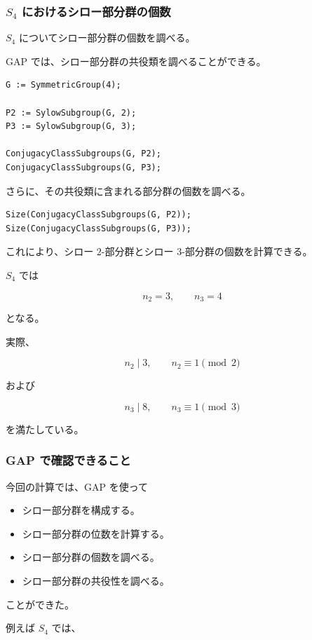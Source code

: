\subsubsection{$S_4$ におけるシロー部分群の個数}

$S_4$ についてシロー部分群の個数を調べる。

GAP では、シロー部分群の共役類を調べることができる。

\begin{lstlisting}[language={}]
G := SymmetricGroup(4);

P2 := SylowSubgroup(G, 2);
P3 := SylowSubgroup(G, 3);

ConjugacyClassSubgroups(G, P2);
ConjugacyClassSubgroups(G, P3);
\end{lstlisting}

さらに、その共役類に含まれる部分群の個数を調べる。

\begin{lstlisting}[language={}]
Size(ConjugacyClassSubgroups(G, P2));
Size(ConjugacyClassSubgroups(G, P3));
\end{lstlisting}

これにより、シロー $2$-部分群とシロー $3$-部分群の個数を計算できる。

$S_4$ では

\[
n_2=3,\qquad n_3=4
\]

となる。

実際、

\[
n_2\mid3,\qquad n_2\equiv1\pmod2
\]

および

\[
n_3\mid8,\qquad n_3\equiv1\pmod3
\]

を満たしている。

\subsubsection{GAP で確認できること}

今回の計算では、GAP を使って

\begin{itemize}
  \item シロー部分群を構成する。
  \item シロー部分群の位数を計算する。
  \item シロー部分群の個数を調べる。
  \item シロー部分群の共役性を調べる。
\end{itemize}

ことができた。

例えば $S_4$ では、

